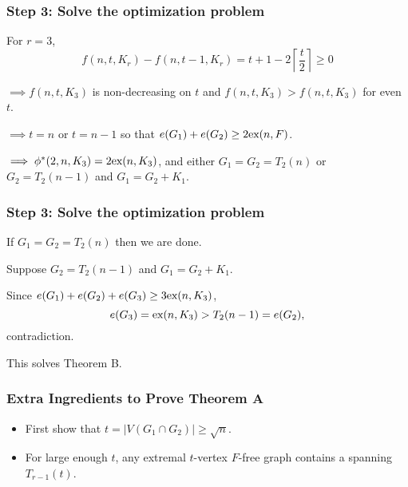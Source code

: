 \documentclass{beamer}
\newcommand*{\ex}{\textnormal{ex}}
\begin{document}
\begin{frame}
  \frametitle{Step 3: Solve the optimization problem}

  For $r = 3$,
  \[
    f(n, t, K_r) - f(n, t - 1, K_r) = t + 1 - 2\left\lceil \frac{t}{2} \right\rceil \geq 0
  \]

  \pause

  \vspace{0.5cm}

  $\implies f(n, t, K_3)$ is non-decreasing on $t$ and $f(n, t, K_3) > f(n, t, K_3)$ for even $t$.

  \pause

  \vspace{0.5cm}

  $\implies t = n$ or $t = n - 1$ so that $e(G_1) + e(G_2) \geq 2\ex(n, F)$.

  \pause

  \vspace{0.5cm}

  $\implies \phi^*(2, n, K_3) = 2\ex(n, K_3)$, and either $G_1 = G_2 = T_{2}(n)$ or $G_2 = T_{2}(n - 1)$ and $G_1 = G_2 + K_1$.
\end{frame}

\begin{frame}
  \frametitle{Step 3: Solve the optimization problem}

  If $G_1 = G_2 = T_{2}(n)$ then we are done.

  \pause

  \vspace{0.5cm}

  Suppose $G_2 = T_{2}(n - 1)$ and $G_1 = G_2 + K_1$. 

  \pause

  \vspace{0.5cm}

  Since $e(G_1) + e(G_2) + e(G_3) \geq 3\ex(n, K_3)$,
  \[
    e(G_3) = \ex(n, K_3) > T_{2}(n - 1) = e(G_2),
  \]
  contradiction.

  \pause

  \vspace{0.5cm}

  This solves Theorem B.
\end{frame}

\begin{frame}
  \frametitle{Extra Ingredients to Prove Theorem A}

  \begin{itemize}
    \item First show that $t = |V(G_1 \cap G_2)| \geq \sqrt{n}$.
    \item For large enough $t$, any extremal $t$-vertex $F$-free graph contains a spanning $T_{r - 1}(t)$.
  \end{itemize}
\end{frame}
\end{document}
